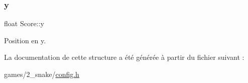 \subsubsection{\texorpdfstring{y}{y}}
{\footnotesize\ttfamily float Score\+::y}



Position en y. 



La documentation de cette structure a été générée à partir du fichier suivant \+:\begin{DoxyCompactItemize}
\item 
games/2\+\_\+snake/\hyperlink{2__snake_2config_8h}{config.\+h}\end{DoxyCompactItemize}
